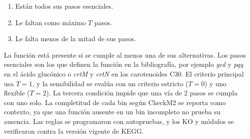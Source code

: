 \begin{nuevo}
\begin{enumerate}
    \item Están todos sus pasos esenciales.
    \item Le faltan como máximo $T$ pasos.
    \item Le falta menos de la mitad de sus pasos.
\end{enumerate}

La función está presente si se cumple al menos una de sus alternativas. Los
pasos esenciales son los que definen la función en la bibliografía, por ejemplo
\textit{gcd} y \textit{pqq} en el ácido glucónico o \textit{crtM} y
\textit{crtN} en los carotenoides C30. El criterio principal usa $T = 1$, y la
sensibilidad se evalúa con un criterio estricto ($T = 0$) y uno flexible
($T = 2$). La tercera condición impide que una vía de 2 pasos se cumpla con uno
solo. La completitud de cada bin según CheckM2 se reporta como contexto, ya que
una función ausente en un bin incompleto no prueba su ausencia. Las reglas se
programaron con autopruebas, y los KO y módulos se verificaron contra la
versión vigente de KEGG.


\end{nuevo}
